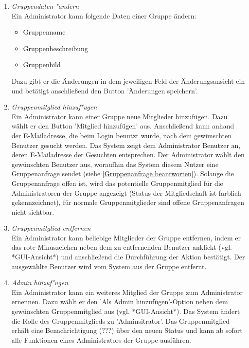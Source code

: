 \documentclass[parskip=full]{scrartcl}
\def\threedigits#1{%
  \ifnum#1<100 0\fi
  \ifnum#1<10 0\fi
  \number#1}
\begin{document}
\begin{enumerate}[label={\textbf{/F\protect\threedigits{\theenumi}0/}}, leftmargin=*, resume]

	\item \textit{Gruppendaten "andern}\\
	Ein Administrator kann folgende Daten einer Gruppe ändern:
	\begin{itemize}
	\item Gruppenname
	\item \colorbox{shadecolor}{Gruppenbeschreibung}
	\item \colorbox{shadecolor}{Gruppenbild}
	\end{itemize}
	Dazu gibt er die Änderungen in dem jeweiligen Feld der Änderungsansicht ein und betätigt anschließend den Button 'Änderungen speichern'.
	
	\item \textit{Gruppenmitglied hinzuf"ugen} \label{Mitglieder hinzufügen} \\
	Ein Administrator kann einer Gruppe neue Mitglieder hinzufügen. Dazu wählt er den Button 'Mitglied hinzufügen' aus. Anschließend kann anhand der E-Mailadresse, die beim Login benutzt wurde, nach dem gewünschten Benutzer gesucht werden. Das System zeigt dem Administrator Benutzer an, deren E-Mailadresse der Gesuchten entsprechen. Der Administrator wählt den gewünschten Benutzer aus, woraufhin das System diesem Nutzer eine Gruppenanfrage sendet (siehe \ref{Gruppenanfrage beantworten}). Solange die Gruppenanfrage offen ist, wird das potentielle Gruppenmitglied für die Administratoren der Gruppe angezeigt (Status der Mitgliedschaft ist farblich gekennzeichnet), für normale Gruppenmitglieder sind offene Gruppenanfragen nicht sichtbar.
	
	\item \textit{Gruppenmitglied entfernen}\\
	Ein Administrator kann beliebige Mitglieder der Gruppe entfernen, indem er das rote Minuszeichen neben dem zu entfernenden Benutzer anklickt (vgl. *GUI-Ansicht*) und anschließend die Durchführung der Aktion bestätigt. Der ausgewählte Benutzer wird vom System aus der Gruppe entfernt.
	
	\item \colorbox{shadecolor}{\textit{Admin hinzuf"ugen}} \label{Admin hinzufügen} \\
	Ein Administrator kann ein weiteres Mitglied der Gruppe zum Administrator ernennen. Dazu wählt er den 'Als Admin hinzufügen'-Option neben dem gewünschten Gruppenmitglied aus (vgl. *GUI-Ansicht*). Das System ändert die Rolle des Gruppenmitglieds zu 'Adminsitrator'. Das Gruppenmitglied erhält eine Benachrichtigung (???) über den neuen Status und kann ab sofort alle Funktionen eines Administrators der Gruppe ausführen.
	

\end{enumerate}
\end{document}
